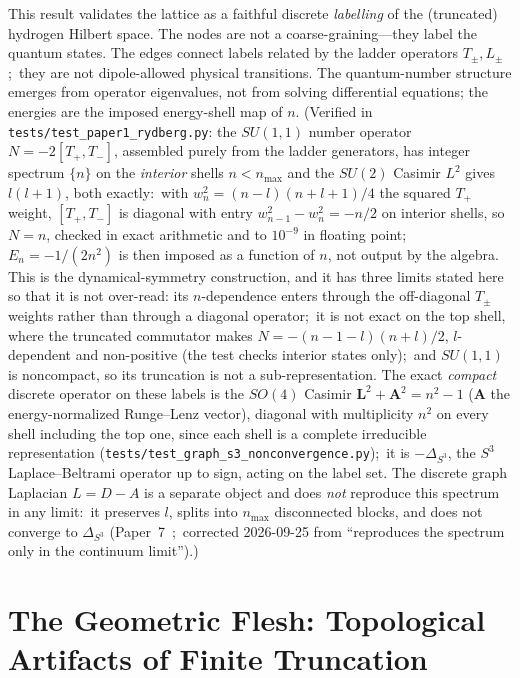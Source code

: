 \documentclass[aps,pra,twocolumn,superscriptaddress,longbibliography]{revtex4-2}
\begin{document}
This result validates the lattice as a faithful discrete \emph{labelling} of the (truncated) hydrogen Hilbert space. The nodes are not a coarse-graining---they label the quantum states. The edges connect labels related by the ladder operators $T_\pm, L_\pm$;\ they are not dipole-allowed physical transitions. The quantum-number structure emerges from operator eigenvalues, not from solving differential equations; the energies are the imposed energy-shell map of $n$. (Verified in \texttt{tests/test\_paper1\_rydberg.py}: the $SU(1,1)$ number operator $N = -2[T_+, T_-]$, assembled purely from the ladder generators, has integer spectrum $\{n\}$ on the \emph{interior} shells $n < n_{\max}$ and the $SU(2)$ Casimir $L^2$ gives $l(l+1)$, both exactly:\ with $w_n^2 = (n-l)(n+l+1)/4$ the squared $T_+$ weight, $[T_+, T_-]$ is diagonal with entry $w_{n-1}^2 - w_n^2 = -n/2$ on interior shells, so $N = n$, checked in exact arithmetic and to $10^{-9}$ in floating point;\ $E_n = -1/(2n^2)$ is then imposed as a function of $n$, not output by the algebra. This is the dynamical-symmetry construction, and it has three limits stated here so that it is not over-read: its $n$-dependence enters through the off-diagonal $T_\pm$ weights rather than through a diagonal operator;\ it is not exact on the top shell, where the truncated commutator makes $N = -(n-1-l)(n+l)/2$, $l$-dependent and non-positive (the test checks interior states only);\ and $SU(1,1)$ is noncompact, so its truncation is not a sub-representation. The exact \emph{compact} discrete operator on these labels is the $SO(4)$ Casimir $\mathbf{L}^2 + \mathbf{A}^2 = n^2 - 1$ ($\mathbf{A}$ the energy-normalized Runge--Lenz vector), diagonal with multiplicity $n^2$ on every shell including the top one, since each shell is a complete irreducible representation (\texttt{tests/test\_graph\_s3\_nonconvergence.py});\ it is $-\Delta_{S^3}$, the $S^3$ Laplace--Beltrami operator up to sign, acting on the label set. The discrete graph Laplacian $L = D - A$ is a separate object and does \emph{not} reproduce this spectrum in any limit:\ it preserves $l$, splits into $n_{\max}$ disconnected blocks, and does not converge to $\Delta_{S^3}$ (Paper~7~\cite{loutey_paper7};\ corrected 2026-09-25 from ``reproduces the spectrum only in the continuum limit'').)


\section{The Geometric Flesh: Topological Artifacts of Finite Truncation}
\label{sec:geometry}
\end{document}
